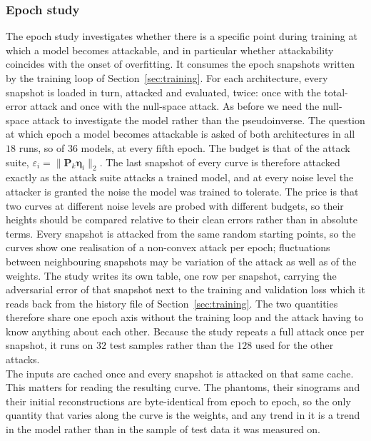 \documentclass{article}
\numberwithin{equation}{section}
\begin{document}
\subsubsection{Epoch study}\label{sec:epoch}
The epoch study investigates whether there is a specific point during training at which a model becomes attackable,
and in particular whether attackability coincides with the onset of overfitting.
It consumes the epoch snapshots written by the training loop of Section~\ref{sec:training}. For each architecture,
every snapshot is loaded in turn, attacked and evaluated, twice: once with the total-error attack and
once with the null-space attack. As before we need the null-space attack to investigate the model rather
than the pseudoinverse. The question at which epoch a model becomes attackable is
asked of both architectures in all $18$ runs, so of $36$ models, at every fifth epoch.
The budget is that of the attack suite, $\varepsilon_i=\lVert\mathbf{P}_k\boldsymbol{\eta}_i\rVert_2$. The last
snapshot of every curve is therefore attacked exactly as the attack suite attacks a trained model, and at
every noise level the attacker is granted the noise the model was trained to tolerate. The price is that
two curves at different noise levels are probed with different budgets, so their heights should be
compared relative to their clean errors rather than in absolute terms. Every snapshot is attacked from
the same random starting points, so the curves show one realisation of a non-convex attack per epoch;
fluctuations between neighbouring snapshots may be variation of the attack as well as of the weights.
The study writes its own table, one row per snapshot,
carrying the adversarial error of that snapshot next to
the training and validation loss which it reads back from the history file of
Section~\ref{sec:training}. The two quantities therefore share one epoch axis
without the training loop and the attack having to know anything about each
other. Because the study repeats a full attack once per snapshot, it runs on $32$
test samples rather than the $128$ used for the other attacks.\\
The inputs are cached once and every snapshot is attacked on that same cache.
This matters for reading the resulting curve. The phantoms, their sinograms and
their initial reconstructions are byte-identical from epoch to epoch, so the
only quantity that varies along the curve is the weights, and any trend in it is
a trend in the model rather than in the sample of test data it was measured on.
\end{document}
